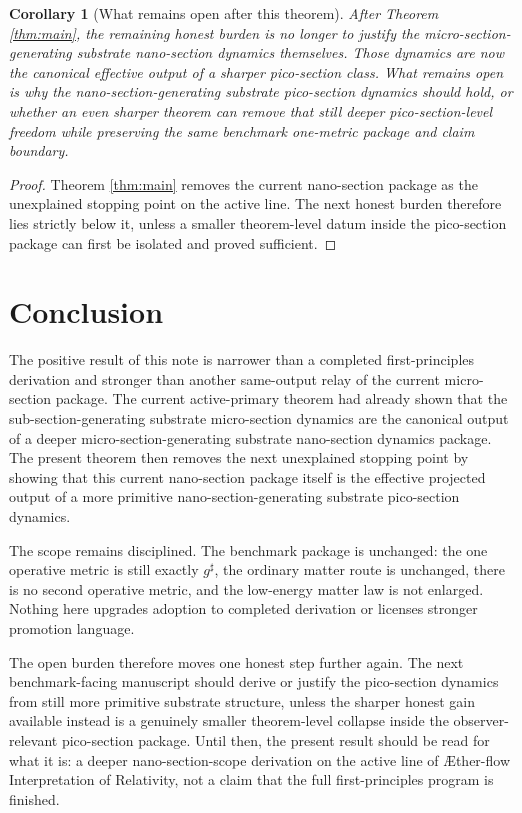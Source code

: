 \documentclass[11pt]{article}
\newcommand{\Aflow}{\AE{}ther-flow}
\newcommand{\TheoryName}{\Aflow{} Interpretation of Relativity}
\newcommand{\CompletedMetric}{g^{\sharp}}
\newtheorem{corollary}{Corollary}
\begin{document}
\begin{corollary}[What remains open after this theorem]
\label{cor:next}
After Theorem \ref{thm:main}, the remaining honest burden is no longer to justify the micro-section-generating substrate nano-section dynamics themselves. Those dynamics are now the canonical effective output of a sharper pico-section class. What remains open is why the nano-section-generating substrate pico-section dynamics should hold, or whether an even sharper theorem can remove that still deeper pico-section-level freedom while preserving the same benchmark one-metric package and claim boundary.
\end{corollary}

\begin{proof}
Theorem \ref{thm:main} removes the current nano-section package as the unexplained stopping point on the active line. The next honest burden therefore lies strictly below it, unless a smaller theorem-level datum inside the pico-section package can first be isolated and proved sufficient.
\end{proof}

\section{Conclusion}

The positive result of this note is narrower than a completed first-principles derivation and stronger than another same-output relay of the current micro-section package. The current active-primary theorem had already shown that the sub-section-generating substrate micro-section dynamics are the canonical output of a deeper micro-section-generating substrate nano-section dynamics package. The present theorem then removes the next unexplained stopping point by showing that this current nano-section package itself is the effective projected output of a more primitive nano-section-generating substrate pico-section dynamics.

The scope remains disciplined. The benchmark package is unchanged: the one operative metric is still exactly \(\CompletedMetric\), the ordinary matter route is unchanged, there is no second operative metric, and the low-energy matter law is not enlarged. Nothing here upgrades adoption to completed derivation or licenses stronger promotion language.

The open burden therefore moves one honest step further again. The next benchmark-facing manuscript should derive or justify the pico-section dynamics from still more primitive substrate structure, unless the sharper honest gain available instead is a genuinely smaller theorem-level collapse inside the observer-relevant pico-section package. Until then, the present result should be read for what it is: a deeper nano-section-scope derivation on the active line of \TheoryName{}, not a claim that the full first-principles program is finished.
\end{document}

